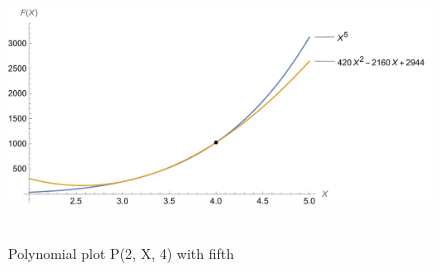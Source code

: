﻿\begin{figure}[H]
    \centering
    \includegraphics[width=1\textwidth]{sections/images/04_plots_polynomial_q2_n4_with_fifth}
    ~\caption{Polynomial plot P(2, X, 4) with fifth}\label{fig:figure10}
\end{figure}
